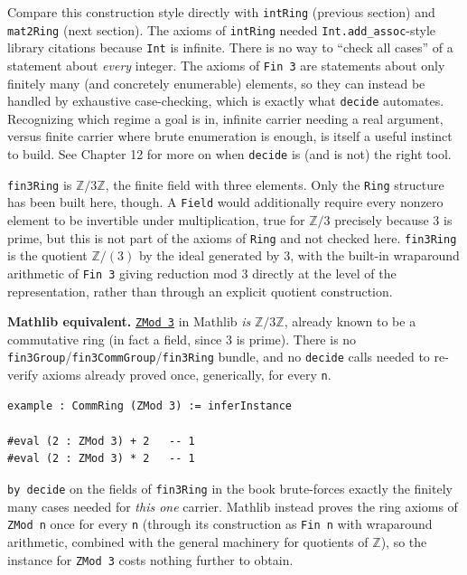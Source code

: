 Compare this construction style directly with \texttt{intRing} (previous section) and \texttt{mat2Ring} (next section). The axioms of \texttt{intRing} needed \texttt{Int.add\_\allowbreak{}assoc}-style library citations because \texttt{Int} is infinite. There is no way to ``check all cases'' of a statement about \emph{every} integer. The axioms of \texttt{Fin 3} are statements about only finitely many (and concretely enumerable) elements, so they can instead be handled by exhaustive case-checking, which is exactly what \texttt{decide} automates. Recognizing which regime a goal is in, infinite carrier needing a real argument, versus finite carrier where brute enumeration is enough, is itself a useful instinct to build. See Chapter 12 for more on when \texttt{decide} is (and is not) the right tool.

\begin{mathreading}

\texttt{fin3Ring} is \(\mathbb{Z}/3\mathbb{Z}\), the finite field with three elements. Only the \texttt{Ring} structure has been built here, though. A \texttt{Field} would additionally require every nonzero element to be invertible under multiplication, true for \(\mathbb{Z}/3\) precisely because \(3\) is prime, but this is not part of the axioms of \texttt{Ring} and not checked here. \texttt{fin3Ring} is the quotient \(\mathbb{Z}/(3)\) by the ideal generated by \(3\), with the built-in wraparound arithmetic of \texttt{Fin 3} giving reduction mod \(3\) directly at the level of the representation, rather than through an explicit quotient construction.

\end{mathreading}

\textbf{Mathlib equivalent.} \href{https://loogle.lean-lang.org/?q=ZMod}{\texttt{ZMod 3}} in Mathlib \emph{is} \(\mathbb{Z}/3\mathbb{Z}\), already known to be a commutative ring (in fact a field, since \(3\) is prime). There is no \texttt{fin3Group}/\texttt{fin3CommGroup}/\texttt{fin3Ring} bundle, and no \texttt{decide} calls needed to re-verify axioms already proved once, generically, for every \texttt{n}.

\begin{lstlisting}
example : CommRing (ZMod 3) := inferInstance

#eval (2 : ZMod 3) + 2   -- 1
#eval (2 : ZMod 3) * 2   -- 1
\end{lstlisting}

\texttt{by decide} on the fields of \texttt{fin3Ring} in the book brute-forces exactly the finitely many cases needed for \emph{this one} carrier. Mathlib instead proves the ring axioms of \texttt{ZMod n} once for every \texttt{n} (through its construction as \texttt{Fin n} with wraparound arithmetic, combined with the general machinery for quotients of \(\mathbb{Z}\)), so the instance for \texttt{ZMod 3} costs nothing further to obtain.

